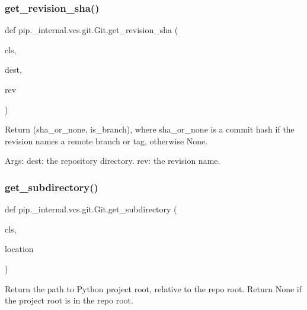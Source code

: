 \subsubsection{\texorpdfstring{get\+\_\+revision\+\_\+sha()}{get\_revision\_sha()}}
{\footnotesize\ttfamily def pip.\+\_\+internal.\+vcs.\+git.\+Git.\+get\+\_\+revision\+\_\+sha (\begin{DoxyParamCaption}\item[{}]{cls,  }\item[{}]{dest,  }\item[{}]{rev }\end{DoxyParamCaption})}

\begin{DoxyVerb}Return (sha_or_none, is_branch), where sha_or_none is a commit hash
if the revision names a remote branch or tag, otherwise None.

Args:
  dest: the repository directory.
  rev: the revision name.
\end{DoxyVerb}
 \mbox{\label{classpip_1_1__internal_1_1vcs_1_1git_1_1Git_a495672bb014464b725f5353f04c64b02}} 
\subsubsection{\texorpdfstring{get\+\_\+subdirectory()}{get\_subdirectory()}}
{\footnotesize\ttfamily def pip.\+\_\+internal.\+vcs.\+git.\+Git.\+get\+\_\+subdirectory (\begin{DoxyParamCaption}\item[{}]{cls,  }\item[{}]{location }\end{DoxyParamCaption})}

\begin{DoxyVerb}Return the path to Python project root, relative to the repo root.
Return None if the project root is in the repo root.
\end{DoxyVerb}
 \mbox{\label{classpip_1_1__internal_1_1vcs_1_1git_1_1Git_a6f5f76aa10b8e86ccd3c87826875cf8d}} 
